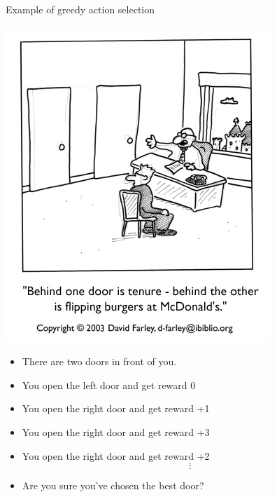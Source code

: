 \bgroup
\begin{frame}{Example of greedy action selection}
\begin{minipage}{0.4\textwidth}
\includegraphics[width=\textwidth]{img/doors.jpg}
\end{minipage}
\begin{minipage}{0.55\textwidth}
\begin{itemize}
\item There are two doors in front of you.
\item You open the left door and get reward 0\\
\item You open the right door and get reward +1\\
\item You open the right door and get reward +3\\
\item You open the right door and get reward +2\\
\begin{equation*}
\vdots
\end{equation*}
\item Are you sure you've chosen the best door?
\end{itemize}
\end{minipage}
\end{frame}
\egroup
